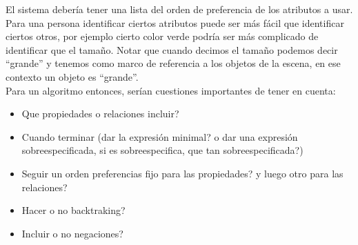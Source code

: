 El sistema deber\'ia tener una lista del orden de preferencia de los atributos a usar.\\ 

Para una persona identificar ciertos atributos puede ser m\'as f\'acil que identificar ciertos otros, por ejemplo cierto color verde podr\'{i}a ser m\'as complicado de identificar que el tama\~no. Notar que cuando decimos el tama\~no podemos decir ``grande'' y tenemos como marco de referencia a los objetos de la escena, en ese contexto un objeto es ``grande''.\\

Para un algoritmo entonces, ser\'ian cuestiones importantes de tener en cuenta:

\begin{itemize}
 \item Que propiedades o relaciones incluir?
 \item Cuando terminar (dar la expresi\'on minimal? o dar una expresi\'on sobreespecificada, si es sobreespecifica, que tan sobreespecificada?)
 \item Seguir un orden preferencias fijo para las propiedades? y luego otro para las relaciones?
 \item Hacer o no backtraking?
 \item Incluir o no negaciones?
\end{itemize}